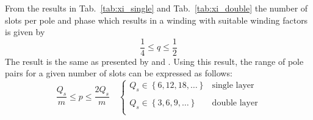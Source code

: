 From the results in Tab.~\ref{tab:xi_single} and Tab.~\ref{tab:xi_double} the number of slots per pole and phase which results in a winding with suitable winding factors is given by
\begin{equation}
  \frac{1}{4} \leq q \leq \frac{1}{2}
\end{equation}
The result is the same as presented by \cite{cros_2002} and \cite{skaar_2006}. Using this result, the range of pole pairs for a given number of slots can be expressed as follows:
\begin{equation}
  \frac{Q_s}{m} \leq p \leq \frac{2Q_s}{m}
  \quad
  \left\{
  \begin{array}{ll}
  Q_s \in \left\{6,12,18,\ldots\right\} & \mbox{single layer}\\
  \:  & \: \\
  Q_s \in \left\{3,6,9,\ldots\right\} & \mbox{double layer}\\
  \end{array}
  \right.
\end{equation} 

